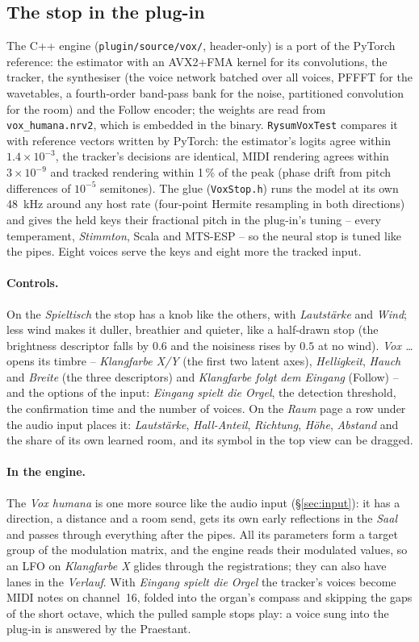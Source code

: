 \documentclass[11pt,a4paper,parskip=half,DIV=11,toc=bibliography]{scrartcl}
\newcommand{\ui}[1]{\emph{#1}}                 %
\newcommand{\fn}[1]{\mbox{\texttt{#1}}}
\begin{document}
\subsection{The stop in the plug-in}
The C++ engine (\fn{plugin/source/vox/}, header-only) is a port of the PyTorch reference: the estimator with an AVX2+FMA kernel for its convolutions,
the tracker, the synthesiser (the voice network batched over all voices, PFFFT for the wavetables, a fourth-order band-pass bank for the noise,
partitioned convolution for the room) and the Follow encoder; the weights are read from \fn{vox\_humana.nrv2}, which is embedded in the binary.
\fn{RysumVoxTest} compares it with reference vectors written by PyTorch: the estimator's logits agree within $1.4\times10^{-3}$, the tracker's decisions
are identical, MIDI rendering agrees within $3\times10^{-9}$ and tracked rendering within 1\,\% of the peak (phase drift from pitch differences of
$10^{-5}$ semitones). The glue (\fn{VoxStop.h}) runs the model at its own \SI{48}{kHz} around any host rate (four-point Hermite resampling in both
directions) and gives the held keys their fractional pitch in the plug-in's tuning -- every temperament, \ui{Stimmton}, Scala and MTS-ESP -- so the
neural stop is tuned like the pipes. Eight voices serve the keys and eight more the tracked input.

\paragraph{Controls.} On the \ui{Spieltisch} the stop has a knob like the others, with \ui{Lautstärke} and \ui{Wind}; less wind makes it duller, breathier
and quieter, like a half-drawn stop (the brightness descriptor falls by $0.6$ and the noisiness rises by $0.5$ at no wind). \ui{Vox \dots} opens its
timbre -- \ui{Klangfarbe X/Y} (the first two latent axes), \ui{Helligkeit}, \ui{Hauch} and \ui{Breite} (the three descriptors) and \ui{Klangfarbe folgt dem
Eingang} (Follow) -- and the options of the input: \ui{Eingang spielt die Orgel}, the detection threshold, the confirmation time and the number of voices.
On the \ui{Raum} page a row under the audio input places it: \ui{Lautstärke}, \ui{Hall-Anteil}, \ui{Richtung}, \ui{Höhe}, \ui{Abstand} and the share of its
own learned room, and its symbol in the top view can be dragged.

\paragraph{In the engine.} The \ui{Vox humana} is one more source like the audio input (\S\ref{sec:input}): it has a direction, a distance and a room send,
gets its own early reflections in the \ui{Saal} and passes through everything after the pipes. All its parameters form a target group of the modulation
matrix, and the engine reads their modulated values, so an LFO on \ui{Klangfarbe X} glides through the registrations; they can also have lanes in
the \ui{Verlauf}. With \ui{Eingang spielt die Orgel} the tracker's voices become MIDI notes on channel~16, folded into the organ's compass and skipping the
gaps of the short octave, which the pulled sample stops play: a voice sung into the plug-in is answered by the Praestant.
\end{document}
